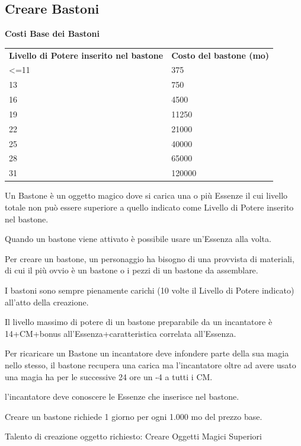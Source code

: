 \documentclass[a4paper,11pt,twoside,openany]{book}
\begin{document}
\subsection{Creare Bastoni}

\textbf{Costi Base dei Bastoni}

\bigskip

\begin{tabular}{ll}
	\toprule
	\textbf{Livello di Potere inserito nel bastone} & \textbf{Costo del bastone (mo)}\tabularnewline
	\textless=11                                    & 375\tabularnewline
	13                                              & 750\tabularnewline
	16                                              & 4500\tabularnewline
	19                                              & 11250\tabularnewline
	22                                              & 21000\tabularnewline
	25                                              & 40000\tabularnewline
	28                                              & 65000\tabularnewline
	31                                              & 120000\tabularnewline
\end{tabular}

\bigskip

Un Bastone è un oggetto magico dove si carica una o più Essenze il cui livello totale non può essere superiore a quello indicato come Livello di Potere inserito nel bastone.

Quando un bastone viene attivato è possibile usare un'Essenza alla volta.

Per creare un bastone, un personaggio ha bisogno di una provvista di materiali, di cui il più ovvio è un bastone o i pezzi di un bastone da assemblare.

I bastoni sono sempre pienamente carichi (10 volte il Livello di Potere indicato) all'atto della creazione.

Il livello massimo di potere di un bastone preparabile da un incantatore è 14+CM+bonus all'Essenza+caratteristica correlata all'Essenza.

Per ricaricare un Bastone un incantatore deve infondere parte della sua magia nello stesso, il bastone recupera una carica ma l'incantatore oltre ad avere usato una magia ha per le successive 24 ore un -4 a tutti i CM.

l'incantatore deve conoscere le Essenze che inserisce nel bastone.

Creare un bastone richiede 1 giorno per ogni 1.000 mo del prezzo base.

Talento di creazione oggetto richiesto: Creare Oggetti Magici Superiori
\end{document}
